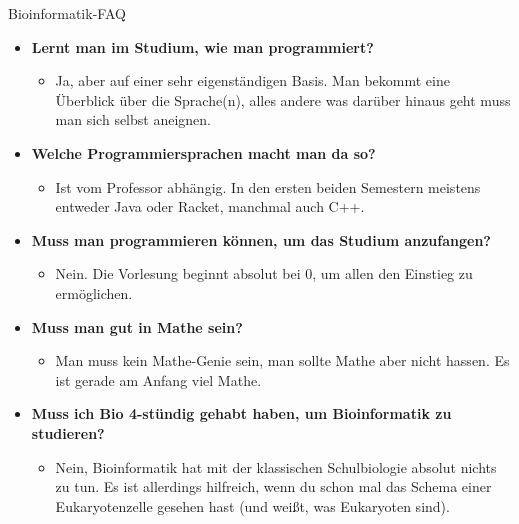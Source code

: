 \begin{LARGE}
	Bioinformatik-FAQ
\end{LARGE}
\begin{large}
		\begin{itemize}
		\item \textbf{Lernt man im Studium, wie man programmiert?}
		\begin{itemize}
			\item Ja, aber auf einer sehr eigenständigen Basis. Man bekommt eine Überblick über die Sprache(n), alles andere was darüber hinaus geht muss man sich selbst aneignen.
		\end{itemize}
	\end{itemize}
	
	\begin{itemize}
		\item \textbf{Welche Programmiersprachen macht man da so?}
		\begin{itemize}
			\item Ist vom Professor abhängig. In den ersten beiden Semestern meistens entweder Java oder Racket, manchmal auch C++.
		\end{itemize}
	\end{itemize}
	
	\begin{itemize}
		\item \textbf{Muss man programmieren können, um das Studium anzufangen?}
		\begin{itemize}
			\item Nein. Die Vorlesung beginnt absolut bei 0, um allen den Einstieg zu ermöglichen.
		\end{itemize}
	\end{itemize}
	
	\begin{itemize}
		\item \textbf{Muss man gut in Mathe sein?}
		\begin{itemize}
			\item Man muss kein Mathe-Genie sein, man sollte Mathe aber nicht hassen. Es ist gerade am Anfang viel Mathe.
		\end{itemize}
	\end{itemize}

			\begin{itemize}
				\item \textbf{Muss ich Bio 4-stündig gehabt haben, um Bioinformatik zu studieren?}
				\begin{itemize}
					\item Nein, Bioinformatik hat mit der klassischen Schulbiologie absolut nichts zu tun. Es ist allerdings hilfreich, wenn du schon mal das Schema einer Eukaryotenzelle gesehen hast (und weißt, was Eukaryoten sind).
				\end{itemize}
			\end{itemize}
		

\end{large}
